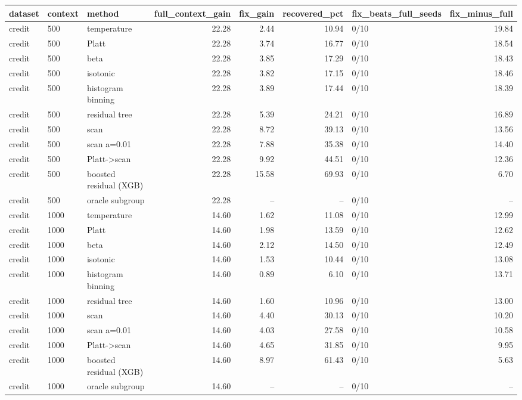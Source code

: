\begin{tabular}{lllrrrlr}
\toprule
dataset & context & method & full_context_gain & fix_gain & recovered_pct & fix_beats_full_seeds & fix_minus_full \\
\midrule
credit & 500 & temperature & 22.28 & 2.44 & 10.94 & 0/10 & 19.84 \\
credit & 500 & Platt & 22.28 & 3.74 & 16.77 & 0/10 & 18.54 \\
credit & 500 & beta & 22.28 & 3.85 & 17.29 & 0/10 & 18.43 \\
credit & 500 & isotonic & 22.28 & 3.82 & 17.15 & 0/10 & 18.46 \\
credit & 500 & histogram binning & 22.28 & 3.89 & 17.44 & 0/10 & 18.39 \\
credit & 500 & residual tree & 22.28 & 5.39 & 24.21 & 0/10 & 16.89 \\
credit & 500 & scan & 22.28 & 8.72 & 39.13 & 0/10 & 13.56 \\
credit & 500 & scan a=0.01 & 22.28 & 7.88 & 35.38 & 0/10 & 14.40 \\
credit & 500 & Platt->scan & 22.28 & 9.92 & 44.51 & 0/10 & 12.36 \\
credit & 500 & boosted residual (XGB) & 22.28 & 15.58 & 69.93 & 0/10 & 6.70 \\
credit & 500 & oracle subgroup & 22.28 & -- & -- & 0/10 & -- \\
credit & 1000 & temperature & 14.60 & 1.62 & 11.08 & 0/10 & 12.99 \\
credit & 1000 & Platt & 14.60 & 1.98 & 13.59 & 0/10 & 12.62 \\
credit & 1000 & beta & 14.60 & 2.12 & 14.50 & 0/10 & 12.49 \\
credit & 1000 & isotonic & 14.60 & 1.53 & 10.44 & 0/10 & 13.08 \\
credit & 1000 & histogram binning & 14.60 & 0.89 & 6.10 & 0/10 & 13.71 \\
credit & 1000 & residual tree & 14.60 & 1.60 & 10.96 & 0/10 & 13.00 \\
credit & 1000 & scan & 14.60 & 4.40 & 30.13 & 0/10 & 10.20 \\
credit & 1000 & scan a=0.01 & 14.60 & 4.03 & 27.58 & 0/10 & 10.58 \\
credit & 1000 & Platt->scan & 14.60 & 4.65 & 31.85 & 0/10 & 9.95 \\
credit & 1000 & boosted residual (XGB) & 14.60 & 8.97 & 61.43 & 0/10 & 5.63 \\
credit & 1000 & oracle subgroup & 14.60 & -- & -- & 0/10 & -- \\

\end{tabular}
